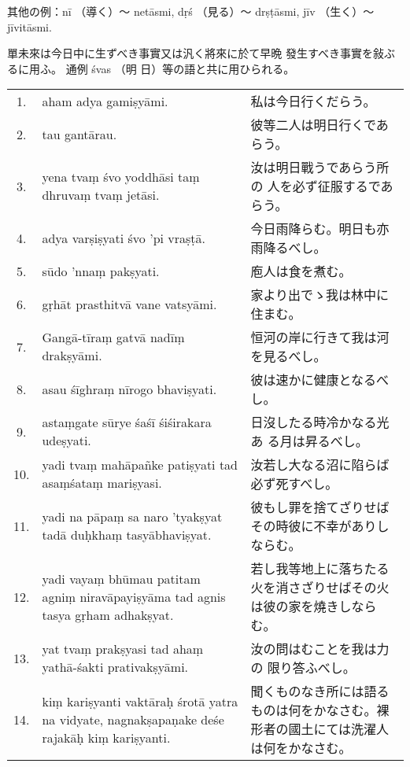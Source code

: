 其他の例：nī （導く）～ netāsmi, dṛś （見る）～ drṣṭāsmi, jīv
（生く）～ jīvitāsmi.

\numberParagraph
單未來は今日中に生ずべき事實又は汎く將來に於て早晩
發生すべき事實を敍ぶるに用ふ。 通例 śvas （明
日）等の語と共に用ひられる。

\begin{longtable}{c*{2}{p{0.45\hsize}}}
 1. & aham adya gamiṣyāmi. & 私は今日行くだらう。\\
 2. & tau gantārau. & 彼等二人は明日行くであらう。\\
 3. & yena tvaṃ śvo yoddhāsi taṃ dhruvaṃ tvaṃ jetāsi. & 汝は明日戰うであらう所の
人を必ず征服するであらう。\\
 4. & adya varṣiṣyati śvo 'pi vraṣṭā. & 今日雨降らむ。明日も亦雨降るべし。\\
 5. & sūdo 'nnaṃ pakṣyati. & 庖人は食を煮む。\\
 6. & gṛhāt prasthitvā vane vats\-yāmi. & 家より出でゝ我は林中に住まむ。\\
 7. & Gangā-tīraṃ gatvā nadīṃ drakṣyāmi. & 恒河の岸に行きて我は河を見るべし。\\
 8. & asau śīghraṃ nīrogo bhavi\-ṣyati. & 彼は速かに健康となるべし。\\
 9. & astaṃgate sūrye śaśī śiśira\-kara udeṣyati. & 日沒したる時冷かなる光あ
る月は昇るべし。\\
10. & yadi tvaṃ mahā\-pañke pati\-ṣyati tad asaṃśataṃ mariṣyasi.
& 汝若し大なる沼に陷らば必ず死すべし。\\
11. & yadi na pāpaṃ sa naro 'tyakṣyat tadā duḥkhaṃ tasyā\-bhaviṣyat.
& 彼もし罪を捨てざりせばその時彼に不幸がありしならむ。\\
12. & yadi vayaṃ bhūmau patitam agniṃ niravāpayiṣyāma tad agnis tasya gṛham adhakṣyat.
& 若し我等地上に落ちたる火を消さざりせばその火は彼の家を燒きしならむ。\\
13. & yat tvaṃ prakṣyasi tad ahaṃ yathā-śakti prativakṣyāmi. & 汝の問はむことを我は力の
限り答ふべし。\\
14. & kiṃ kariṣyanti vaktāraḥ śrotā yatra na vidyate, nagna\-kṣapaṇake deśe rajakāḥ kiṃ
kariṣyanti. & 聞くものなき所には語るものは何をかなさむ。裸形者の國土にては洗濯人は何をかなさむ。
\end{longtable}


